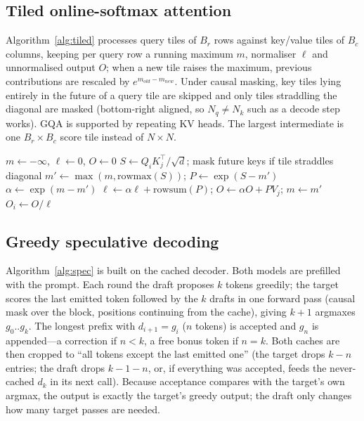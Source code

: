\documentclass[conference]{IEEEtran}
\begin{document}
\subsection{Tiled online-softmax attention}
Algorithm~\ref{alg:tiled} processes query tiles of $B_r$ rows against key/value tiles of $B_c$ columns, keeping per query row a running maximum $m$, normaliser $\ell$ and unnormalised output $O$; when a new tile raises the maximum, previous contributions are rescaled by $e^{m_{old}-m_{new}}$. Under causal masking, key tiles lying entirely in the future of a query tile are skipped and only tiles straddling the diagonal are masked (bottom-right aligned, so $N_q\neq N_k$ such as a decode step works). GQA is supported by repeating KV heads. The largest intermediate is one $B_r\times B_c$ score tile instead of $N\times N$.

\begin{algorithm}[t]
\caption{Tiled online-softmax attention (one head)}
\label{alg:tiled}
\begin{algorithmic}[1]
\State $m \gets -\infty$, $\ell \gets 0$, $O \gets 0$
\State $S \gets Q_i K_j^\top / \sqrt{d}$; mask future keys if tile straddles diagonal
\State $m' \gets \max(m, \mathrm{rowmax}(S))$; $P \gets \exp(S - m')$
\State $\alpha \gets \exp(m - m')$
\State $\ell \gets \alpha \ell + \mathrm{rowsum}(P)$; $O \gets \alpha O + P V_j$; $m \gets m'$
\EndFor
\State $O_i \gets O / \ell$
\EndFor
\end{algorithmic}
\end{algorithm}

\subsection{Greedy speculative decoding}
Algorithm~\ref{alg:spec} is built on the cached decoder. Both models are prefilled with the prompt. Each round the draft proposes $k$ tokens greedily; the target scores the last emitted token followed by the $k$ drafts in one forward pass (causal mask over the block, positions continuing from the cache), giving $k+1$ argmaxes $g_0..g_k$. The longest prefix with $d_{i+1}=g_i$ ($n$ tokens) is accepted and $g_n$ is appended---a correction if $n<k$, a free bonus token if $n=k$. Both caches are then cropped to ``all tokens except the last emitted one'' (the target drops $k-n$ entries; the draft drops $k-1-n$, or, if everything was accepted, feeds the never-cached $d_k$ in its next call). Because acceptance compares with the target's own argmax, the output is exactly the target's greedy output; the draft only changes how many target passes are needed.
\end{document}
